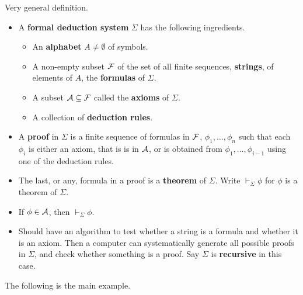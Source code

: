 \begin{definition}
Very general definition.
\begin{itemize}
\item A \textbf{formal deduction system} $ \Sigma $ has the following ingredients.
\begin{itemize}
\item An \textbf{alphabet} $ A \ne \emptyset $ of symbols.
\item A non-empty subset $ \FF $ of the set of all finite sequences, \textbf{strings}, of elements of $ A $, the \textbf{formulas} of $ \Sigma $.
\item A subset $ \AA \subseteq \FF $ called the \textbf{axioms} of $ \Sigma $.
\item A collection of \textbf{deduction rules}.
\end{itemize}
\item A \textbf{proof} in $ \Sigma $ is a finite sequence of formulas in $ \FF $, $ \phi_1, \dots, \phi_n $ such that each $ \phi_i $ is either an axiom, that is is in $ \AA $, or is obtained from $ \phi_1, \dots, \phi_{i - 1} $ using one of the deduction rules.
\item The last, or any, formula in a proof is a \textbf{theorem} of $ \Sigma $. Write $ \vdash_\Sigma \phi $ for $ \phi $ is a theorem of $ \Sigma $.
\end{itemize}
\end{definition}

\begin{remark*}
\hfill
\begin{itemize}
\item If $ \phi \in \AA $, then $ \vdash_\Sigma \phi $.
\item Should have an algorithm to test whether a string is a formula and whether it is an axiom. Then a computer can systematically generate all possible proofs in $ \Sigma $, and check whether something is a proof. Say $ \Sigma $ is \textbf{recursive} in this case.
\end{itemize}
\end{remark*}

The following is the main example.

